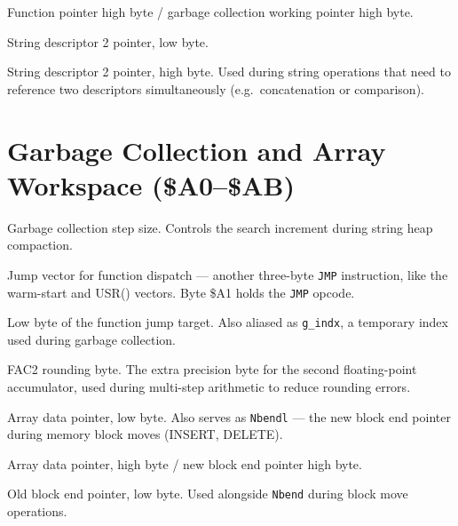 
Function pointer high byte / garbage collection working pointer high byte.


String descriptor 2 pointer, low byte.


String descriptor 2 pointer, high byte.  Used during string operations that
need to reference two descriptors simultaneously (e.g.\ concatenation or
comparison).

\section{Garbage Collection and Array Workspace (\$A0--\$AB)}


Garbage collection step size.  Controls the search increment during string
heap compaction.


Jump vector for function dispatch --- another three-byte \texttt{JMP}
instruction, like the warm-start and USR() vectors.  Byte \$A1 holds the
\texttt{JMP} opcode.


Low byte of the function jump target.  Also aliased as \texttt{g\_indx}, a
temporary index used during garbage collection.


FAC2 rounding byte.  The extra precision byte for the second floating-point
accumulator, used during multi-step arithmetic to reduce rounding errors.


Array data pointer, low byte.  Also serves as \texttt{Nbendl} --- the new
block end pointer during memory block moves (INSERT, DELETE).


Array data pointer, high byte / new block end pointer high byte.


Old block end pointer, low byte.  Used alongside \texttt{Nbend} during block
move operations.

